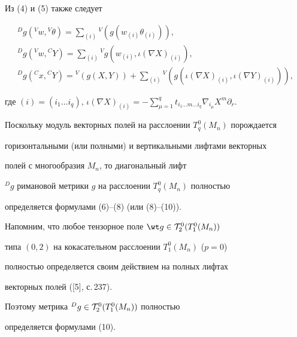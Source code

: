 Из (4) и (5) также следует


\begin{gather}


{}^Dg({}^Vw,{}^V\theta)=\sum_{(i)}{}^V(g(w_{(i)}\theta_{(i)})), \\


%


{}^Dg({}^Vw,{}^CY)=\sum_{(i)}{}^Vg(w_{(i)},\iota(\nabla


X)_{(i)}), \\


%


{}^Dg({}^Cx,{}^CY)={}^V(g(X,Y))+\sum_{(i)}{}^V(g(\iota(


\nabla X)_{(i)},\iota(\nabla Y)_{(i)})),


\end{gather}


где $(i)=(i_1\dotsc i_q)$, $\iota(\nabla X)_{(i)}=


-\sum\limits^q_{\mu=1}t_{i_1\dotsc m\dotsc i_q} \nabla_{i_\mu}X^m


\partial_r$.





Поскольку модуль векторных полей на расслоении $T^0_q(M_n)$ порождается


горизонтальными (или полными) и вертикальными лифтами векторных


полей с многообразия $M_n$, то диагональный лифт


${}^{D}g$ римановой метрики $g$ на расслоении $T^0_q(M_n)$ полностью


определяется формулами (6)--(8) (или (8)--(10)).





\begin{notenonum}


Напомним, что любое тензорное поле ${\wt g}\in{\cal T}^0_2(T^0_1(M_n))$


типа $(0,2)$ на кокасательном расслоении $T^0_1(M_n)$ ($p=0$)


полностью определяется своим действием на полных лифтах


векторных полей ([5], с.\,237).


Поэтому метрика ${}^{D}g\in{\cal T}^0_2(T^0_1(M_n))$ полностью


определяется формулами (10).


\end{notenonum}








